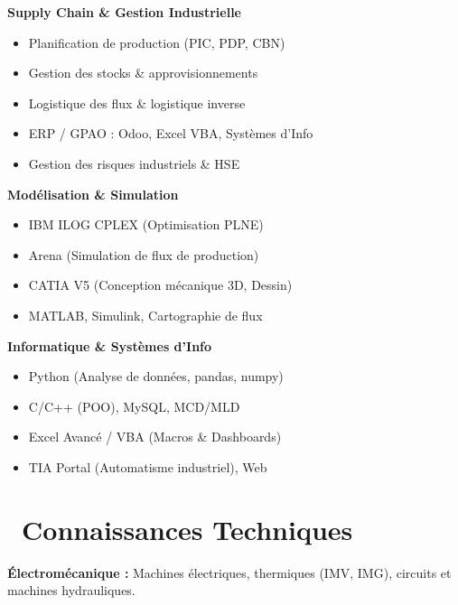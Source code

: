\documentclass[a4paper,9pt]{extarticle}
\def\faWrench{}%
\begin{document}
\begin{minipage}[t]{0.395\textwidth}
  \vspace{1.5pt}
  {\footnotesize \textbf{\color{accent} Supply Chain \& Gestion Industrielle}}
  \begin{itemize}
    \item Planification de production (PIC, PDP, CBN)
    \item Gestion des stocks \& approvisionnements
    \item Logistique des flux \& logistique inverse
    \item ERP / GPAO : Odoo, Excel VBA, Systèmes d'Info
    \item Gestion des risques industriels \& HSE
  \end{itemize}

  \vspace{1.5pt}
  {\footnotesize \textbf{\color{accent} Modélisation \& Simulation}}
  \begin{itemize}
    \item IBM ILOG CPLEX (Optimisation PLNE)
    \item Arena (Simulation de flux de production)
    \item CATIA V5 (Conception mécanique 3D, Dessin)
    \item MATLAB, Simulink, Cartographie de flux
  \end{itemize}

  \vspace{1.5pt}
  {\footnotesize \textbf{\color{accent} Informatique \& Systèmes d'Info}}
  \begin{itemize}
    \item Python (Analyse de données, pandas, numpy)
    \item C/C++ (POO), MySQL, MCD/MLD
    \item Excel Avancé / VBA (Macros \& Dashboards)
    \item TIA Portal (Automatisme industriel), Web
  \end{itemize}

  \vspace{2pt}

  \section{\faWrench\ Connaissances Techniques}
  {\footnotesize
    \textbf{Électromécanique :} Machines électriques, thermiques (IMV, IMG), circuits et machines hydrauliques.
  }

  \vspace{2pt}


\end{minipage}
\end{document}
